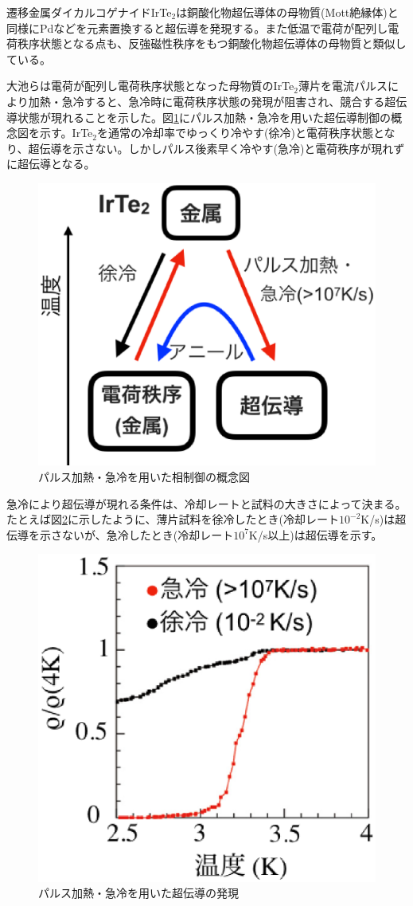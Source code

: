 遷移金属ダイカルコゲナイドIrTe$_2$は銅酸化物超伝導体の母物質(Mott絶縁体)と同様にPdなどを元素置換すると超伝導を発現する\cite{IrTe2Pd_SC}。また低温で電荷が配列し電荷秩序状態となる点も、反強磁性秩序をもつ銅酸化物超伝導体の母物質と類似している。

大池らは電荷が配列し電荷秩序状態となった母物質のIrTe$_2$薄片を電流パルスにより加熱・急冷すると、急冷時に電荷秩序状態の発現が阻害され、競合する超伝導状態が現れることを示した\cite{oike}。図\ref{fig:simplified_schematic}にパルス加熱・急冷を用いた超伝導制御の概念図を示す。IrTe$_2$を通常の冷却率でゆっくり冷やす(徐冷)と電荷秩序状態となり、超伝導を示さない。しかしパルス後素早く冷やす(急冷)と電荷秩序が現れずに超伝導となる。
\begin{figure}[!h]
    \begin{center}
   \includegraphics[width=0.4\hsize]{Introduction/simplified_schematics.eps}
  \end{center}
  \caption{パルス加熱・急冷を用いた相制御の概念図}
  \label{fig:simplified_schematic}
\end{figure}

急冷により超伝導が現れる条件は、冷却レートと試料の大きさによって決まる\cite{oike,Oike_size}。たとえば図\ref{fig:quench_SC}に示したように、薄片試料を徐冷したとき(冷却レート$10^{-2}$K/s)は超伝導を示さないが、急冷したとき(冷却レート$10^7$K/s以上)は超伝導を示す。
\begin{figure}[!h]
    \begin{center}
   \includegraphics[width=0.4\hsize]{Introduction/quench_SC.eps}
  \end{center}
  \caption{パルス加熱・急冷を用いた超伝導の発現}
  \label{fig:quench_SC}
\end{figure}

